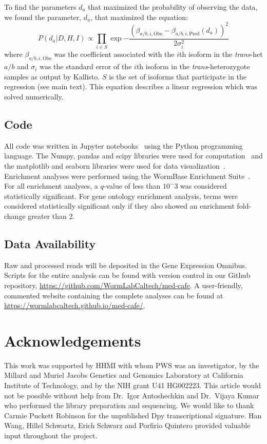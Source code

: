 \documentclass[10pt, twocolumn]{article}
\begin{document}
To find the parameters $d_a$ that maximized the probability of observing the
data, we found the parameter, $d_a$, that maximized the equation:
\begin{equation}
    P(d_a|D,H,I) \propto \prod_{i \in S}
                   \exp{-\frac{{(\beta_{a/b,i,\text{Obs}} -
                                \beta_{a/b,i,\text{Pred}}(d_a))}^2}{
                                2\sigma_i^2}}
\end{equation}
where $\beta_{a/b,i,\text{Obs}}$ was the coefficient associated with the $i$th
isoform in the \emph{trans}-het $a/b$ and $\sigma_i$ was the standard error of
the $i$th isoform in the \emph{trans}-heterozygote samples as output by
Kallisto. $S$ is the set of isoforms that participate in the regression (see
main text). This equation describes a linear regression which was solved
numerically.

\subsection*{Code}
All code was written in Jupyter notebooks~\cite{Perez2007} using the Python
programming language. The Numpy, pandas and scipy libraries were used for
computation~\cite{VanDerWalt2011,McKinney2011,Oliphant2007} and the matplotlib
and seaborn libraries were used for data visualization~\cite{Hunter2007,Waskom}.
Enrichment analyses were performed using the WormBase Enrichment
Suite~\cite{Angeles-Albores2016}. For all enrichment analyses, a $q$-value of
less than $10^-3$ was considered statistically significant. For gene ontology
enrichment analysis, terms were considered statistically significant only if
they also showed an enrichment fold-change greater than 2.

\subsection*{Data Availability}
Raw and processed reads will be deposited in the Gene Expression Omnibus. Scripts
for the entire analysis can be found with version control in our Github
repository, \url{https://github.com/WormLabCaltech/med-cafe}. A user-friendly,
commented website containing the complete analyses can be found at
\url{https://wormlabcaltech.github.io/med-cafe/}.

\section*{Acknowledgements}
This work was supported by HHMI with whom PWS was an investigator, by the
Millard and Muriel Jacobs Genetics and Genomics Laboratory at California
Institute of Technology, and by the NIH grant U41 HG002223. This article
would not be possible without help from Dr.\ Igor Antoshechkin and Dr.\ Vijaya
Kumar who performed the library preparation and sequencing. We would like to
thank Carmie Puckett Robinson for the unpublished Dpy transcriptional
signature. Han Wang, Hillel Schwartz, Erich Schwarz and Porfirio Quintero
provided valuable input throughout the project.



\end{document}
